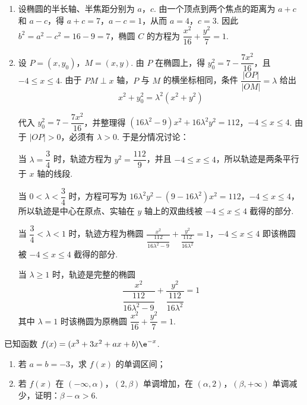 \begin{solution}
\begin{enumerate}
\item 设椭圆的半长轴、半焦距分别为 \(a\)，\(c\). 由一个顶点到两个焦点的距离为 \(a+c\) 和 \(a-c\)，得
\(a+c=7\)，\(a-c=1\)，从而 \(a=4\)，\(c=3\). 因此 \(b^2=a^2-c^2=16-9=7\)，椭圆 \(C\) 的方程为
\(\dfrac{x^2}{16}+\dfrac{y^2}{7}=1\).
\item 设 \(P=(x,y_0)\)，\(M=(x,y)\). 由 \(P\) 在椭圆上，得
\(y_0^2=7-\dfrac{7x^2}{16}\)，且 \(-4\leqslant x\leqslant4\). 由于 \(PM\perp x\) 轴，\(P\) 与 \(M\) 的横坐标相同，条件 \(\dfrac{|OP|}{|OM|}=\lambda\) 给出
\[
x^2+y_0^2=\lambda^2(x^2+y^2)
\]

代入 \(y_0^2=7-\dfrac{7x^2}{16}\)，并整理得
\((16\lambda^2-9)x^2+16\lambda^2y^2=112\)，\(-4\leqslant x\leqslant4\).
由于 \(|OP|>0\)，必须有 \(\lambda>0\). 于是分情况讨论：

当 \(\lambda=\dfrac34\) 时，轨迹方程为 \(y^2=\dfrac{112}{9}\)，并且 \(-4\leqslant x\leqslant4\)，所以轨迹是两条平行于 \(x\) 轴的线段.

当 \(0<\lambda<\dfrac34\) 时，方程可写为
\(16\lambda^2y^2-(9-16\lambda^2)x^2=112\)，\(-4\leqslant x\leqslant4\)，
所以轨迹是中心在原点、实轴在 \(y\) 轴上的双曲线被 \(-4\leqslant x\leqslant4\) 截得的部分.

当 \(\dfrac34<\lambda<1\) 时，轨迹方程为椭圆
\(\frac{x^2}{\dfrac{112}{16\lambda^2-9}}+\frac{y^2}{\dfrac{112}{16\lambda^2}}=1\)，\(-4\leqslant x\leqslant4\)
即该椭圆被 \(-4\leqslant x\leqslant4\) 截得的部分.

当 \(\lambda\geqslant1\) 时，轨迹是完整的椭圆
\[
\frac{x^2}{\dfrac{112}{16\lambda^2-9}}+\frac{y^2}{\dfrac{112}{16\lambda^2}}=1
\]
其中 \(\lambda=1\) 时该椭圆为原椭圆 \(\dfrac{x^2}{16}+\dfrac{y^2}{7}=1\).
\end{enumerate}
\end{solution}

\begin{problem}
已知函数 \( f(x) = (x^3 + 3x^2 + ax + b)\e^{-x} \).

\begin{enumerate}
\item 若 \(a = b = -3\)，求 \(f(x)\) 的单调区间；
\item 若 \(f(x)\) 在 \((-\infty, \alpha)\)，\((2,\beta)\) 单调增加，在 \((\alpha, 2)\)，\((\beta, +\infty)\) 单调减少，证明：\(\beta - \alpha > 6\).
\end{enumerate}
\end{problem}

